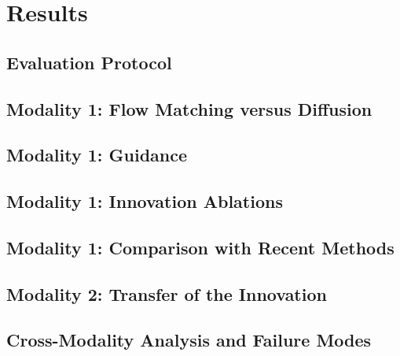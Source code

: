 \section{Results}
\label{sec:results}

\subsection{Evaluation Protocol}
\label{sec:protocol}
\todo{}

\subsection{Modality 1: Flow Matching versus Diffusion}
\label{sec:fm-vs-diff}
\todo{}

\subsection{Modality 1: Guidance}
\label{sec:guidance-results}
\todo{}

\subsection{Modality 1: Innovation Ablations}
\label{sec:ablations}
\todo{}

\subsection{Modality 1: Comparison with Recent Methods}
\label{sec:baselines-m1}
\todo{}

\subsection{Modality 2: Transfer of the Innovation}
\label{sec:transfer-results}
\todo{}

\subsection{Cross-Modality Analysis and Failure Modes}
\label{sec:failures}
\todo{}
